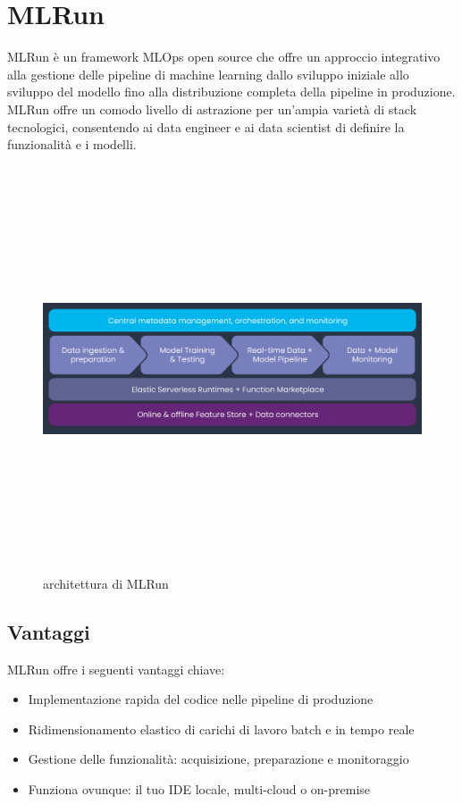 \documentclass[12pt,a4paper]{report}
\begin{document}
\section{MLRun}
MLRun è un framework MLOps open source che offre un approccio integrativo alla gestione delle pipeline di machine learning dallo sviluppo iniziale allo sviluppo del modello fino alla distribuzione completa della pipeline in produzione. MLRun offre un comodo livello di astrazione per un'ampia varietà di stack tecnologici, consentendo ai data engineer e ai data scientist di definire la funzionalità e i modelli.\cite{MLRun}
\\
\begin{figure}[h!]
    \begin{center}
        \includegraphics[width=12cm,height=12cm,keepaspectratio]{MLRun}
    \end{center}
    \caption{architettura di MLRun}
    \label{fig:MLRun}
\end{figure}

\subsection{Vantaggi}
MLRun offre i seguenti vantaggi chiave:

\begin{itemize}
    \item Implementazione rapida del codice nelle pipeline di produzione
    \item Ridimensionamento elastico di carichi di lavoro batch e in tempo reale
    \item Gestione delle funzionalità: acquisizione, preparazione e monitoraggio
    \item Funziona ovunque: il tuo IDE locale, multi-cloud o on-premise
\end{itemize}
\end{document}
